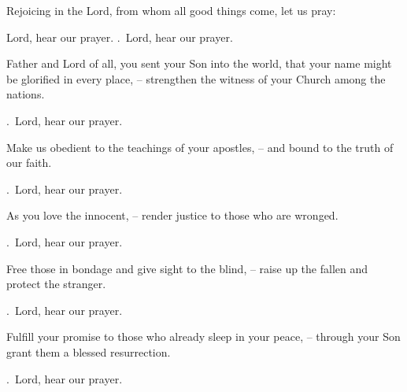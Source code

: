 \lettrine[loversize=0.15,lines=2]{R}{}ejoicing in the Lord, from whom all good things come, let us pray: \par Lord, hear our prayer.
\Rbar.~Lord, hear our prayer.

Father and Lord of all, you sent your Son into the world, that your name might be glorified in every place,
– strengthen the witness of your Church among the nations.
\par \Rbar.~Lord, hear our prayer.

Make us obedient to the teachings of your apostles,
– and bound to the truth of our faith.
\par \Rbar.~Lord, hear our prayer.

As you love the innocent,
– render justice to those who are wronged.
\par \Rbar.~Lord, hear our prayer.

Free those in bondage and give sight to the blind,
– raise up the fallen and protect the stranger.
\par \Rbar.~Lord, hear our prayer.

Fulfill your promise to those who already sleep in your peace,
– through your Son grant them a blessed resurrection.
\par \Rbar.~Lord, hear our prayer.

